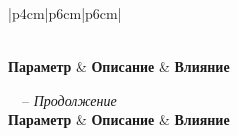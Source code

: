 \begin{longtable}{|p{4cm}|p{6cm}|p{6cm}|}
	\caption{Параметры XGBoost и их влияние}\label{tab:xgboost_params}                                                                                                                  \\

	\hline
	\textbf{Параметр}             & \textbf{Описание}                                         & \textbf{Влияние}                                                                        \\
	\hline
	\endfirsthead

	{\tablename\ \thetable\ -- \textit{Продолжение}}                                                                                                                                    \\
	\hline
	\textbf{Параметр}             & \textbf{Описание}                                         & \textbf{Влияние}                                                                        \\
	\hline
	\endhead

	\hline {}                                                                                                             \\ \hline
	\endfoot

	\hline
	\endlastfoot


\end{longtable}
